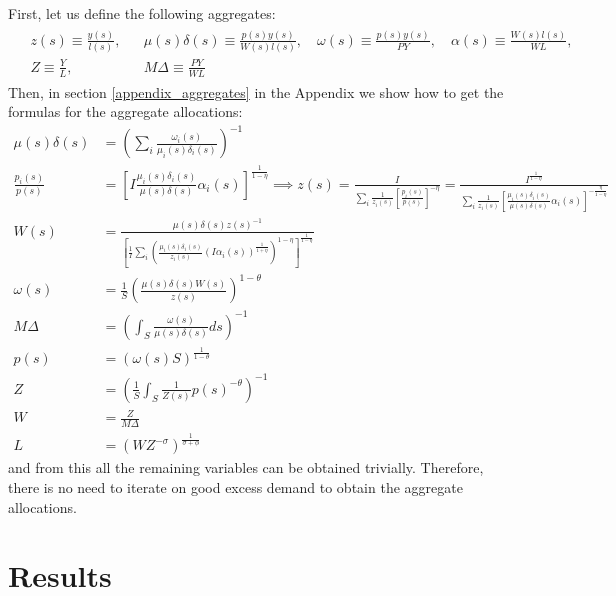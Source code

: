 \documentclass[12pt]{article}%
\begin{document}
First, let us define the following aggregates:
\begin{align} \label{aggregates_definitions}
    \begin{array}{lllll}
        & z(s) \equiv \frac{y(s)}{l(s)}, 
        && \mu(s) \delta(s) \equiv \frac{p(s) y(s)}{W(s) l(s)}, \quad
        \omega(s) \equiv \frac{p(s) y(s)}{P Y}, \quad
        \alpha(s) \equiv \frac{W(s) l(s)}{W L}, \\
        & Z \equiv \frac{Y}{L}, && M \Delta \equiv \frac{P Y}{W L} 
    \end{array} 
\end{align}
Then, in section \ref{appendix_aggregates} in the Appendix we show how to get the formulas for the aggregate allocations:
\begin{align*}
    \mu(s) \delta(s) & = \left( \sum_i \frac{\omega_i(s)}{\mu_i(s) \delta_i(s)} \right)^{-1} \\
    \frac{p_i(s)}{p(s)} &= \left[ I \frac{\mu_i(s) \delta_i(s)}{\mu(s) \delta(s)} \alpha_i(s) \right]^{\frac{1}{1-\eta}} 
    \implies z(s) = \frac{I}{\sum_i \frac{1}{z_i(s)} \left[ \frac{p_i(s)}{p(s)} \right]^{-\eta}} = \frac{I^{\frac{1}{1-\eta}}}{\sum_i \frac{1}{z_i(s)} \left[ \frac{\mu_i(s) \delta_i(s)}{\mu(s) \delta(s)} \alpha_i(s) \right]^{-\frac{\eta}{1-\eta}}} \\
    W(s) &= \frac{\mu(s) \delta(s) z(s)^{-1}}{ \left[ \frac{1}{I} \sum_i \left(\frac{\mu_i(s) \delta_i(s)}{z_i(s)} (I \alpha_i(s))^{\frac{1}{1+\hat{\eta}}} \right) ^{1-\eta} \right]^\frac{1}{1-\eta}}\\
    \omega(s) &= \frac{1}{S} \left( \frac{\mu(s) \delta(s) W(s)}{z(s)} \right)^{1-\theta}  \\
    M \Delta &= \left( \int_S \frac{\omega(s)}{\mu(s)\delta(s)} ds \right)^{-1} \\
    p(s) &= \left( \omega(s) S \right)^{\frac{1}{1-\theta}} \\
    Z &= \left( \frac{1}{S} \int_S \frac{1}{Z(s)} p(s)^{-\theta} \right)^{-1} \\
    W &= \frac{Z}{M \Delta} \\
    L &= \left( W Z^{-\sigma} \right) ^{\frac{1}{\sigma + \phi}}
\end{align*}
and from this all the remaining variables can be obtained trivially. Therefore, there is no need to iterate on good excess demand to obtain the aggregate allocations.

\section{Results}
\end{document}
